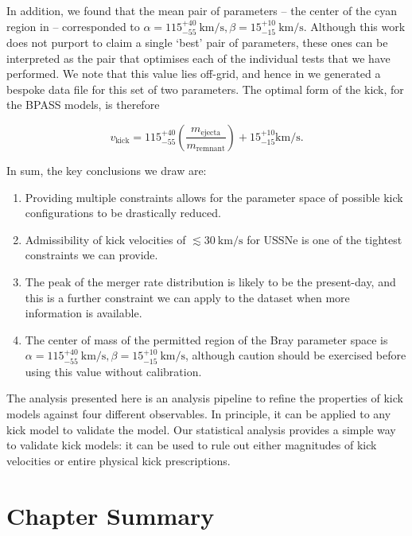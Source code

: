 In addition, we found that the mean pair of parameters -- the center of the cyan region in  -- corresponded to $\alpha=115^{+40}_{-55}~\unit{\kilo\meter\per\second}, \beta=15^{+10}_{-15}~\unit{\kilo\meter\per\second}$. Although this work does not purport to claim a single `best' pair of parameters, these ones can be interpreted as the pair that optimises each of the individual tests that we have performed.  We note that this value lies off-grid, and hence in  we generated a bespoke data file for this set of two parameters. The optimal form of the kick, for the BPASS models, is therefore

\begin{equation}
    v_\text{kick} = 115^{+40}_{-55} \left(\frac{m_\text{ejecta}}{m_\text{remnant}}\right)+15^{+10}_{-15} \unit{\kilo\meter\per\second}.
\end{equation}

In sum, the key conclusions we draw are:

\begin{enumerate}
    \item Providing multiple constraints allows for the parameter space of possible kick configurations to be drastically reduced.
    \item Admissibility of kick velocities of $\lesssim \SI{30}{\kilo\meter\per\second}$ for USSNe is one of the tightest constraints we can provide.
    \item The peak of the merger rate distribution is likely to be the present-day, and this is a further constraint we can apply to the dataset when more information is available.
    \item The center of mass of the permitted region of the Bray parameter space is $\alpha=115^{+40}_{-55}~\unit{\kilo\meter\per\second}, \beta=15^{+10}_{-15}~\unit{\kilo\meter\per\second}$, although caution should be exercised before using this value without calibration.
\end{enumerate}

The analysis presented here is an analysis pipeline to refine the properties of kick models against four different observables. In principle, it can be applied to any kick model to validate the model. Our statistical analysis provides a simple way to validate kick models: it can be used to rule out either magnitudes of kick velocities or entire physical kick prescriptions.

\section{Chapter Summary}


